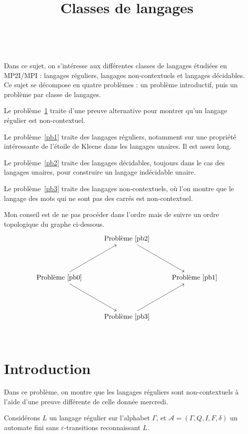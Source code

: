 \documentclass{../notes}
\title{Classes de langages}
\begin{document}
  ~
  \vfill

  \begin{slshape}
  Dans ce sujet, on s'intéresse aux différentes classes de langages étudiées en MP2I/MPI : langages réguliers, langages non-contextuels et langages décidables.
  Ce sujet se décompose en quatre problèmes : un problème introductif, puis un problème par classe de langages.

  Le problème~\ref{pb0} traite d'une preuve alternative pour montrer qu'un langage régulier est non-contextuel.

  Le problème~\ref{pb1} traite des langages réguliers, notamment sur une propriété intéressante de l'étoile de Kleene dans les langages unaires. Il est assez long.

  Le problème~\ref{pb2} traite des langages décidables, toujours dans le cas des langages unaires, pour construire un langage indécidable unaire.

  Le problème~\ref{pb3} traite des langages non-contextuels, où l'on montre que le langage des mots qui ne sont pas des carrés est non-contextuel.

  Mon conseil est de ne pas procéder dans l'ordre mais de suivre un ordre topologique du graphe ci-dessous.
  \[
  \begin{tikzcd}[row sep=40]
    &\text{Problème \ref{pb2}} \arrow{dr}\\
    \arrow{ur}\arrow{dr}\text{Problème \ref{pb0}}&&\text{Problème \ref{pb1}}\\
    &\text{Problème \ref{pb3}} \arrow{ur}
  \end{tikzcd}
  \] 
  \end{slshape}

  \vfill
  \vfill

  \clearpage

  ~
  \vfill
  \vfill
  
  \tableofcontents

  \vfill
  \vfill
  \vfill

  \clearpage

  \section{Introduction} \label{pb0}

  Dans ce problème, on montre que les langages réguliers sont non-contextuels à l'aide d'une preuve différente de celle donnée mercredi.

  Considérons $L$ un langage régulier sur l'alphabet $\Gamma$, et $\mathcal{A} = (\Gamma, Q, I, F, \delta)$ un automate fini sans $\varepsilon$-transitions reconnaissant $L$.
\end{document}
